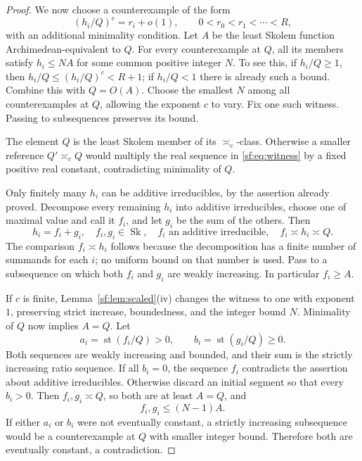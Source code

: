 \documentclass[10pt,a4paper]{amsart}
\newcommand{\Sk}{\operatorname{Sk}}
\newcommand{\arch}{\mathrel{\asymp}}
\newcommand{\st}{\operatorname{st}}
\begin{document}
\begin{proof}
We now choose a counterexample of the form
\begin{equation}
 (h_i/Q)^c=r_i+o(1),\qquad 0<r_0<r_1<\cdots<R,
 \label{sf:eq:witness}
\end{equation}
with an additional minimality condition. Let $A$ be the least Skolem
function Archimedean-equivalent to $Q$. For every counterexample
at $Q$, all its members satisfy $h_i\le NA$ for some common
positive integer $N$. To see this, if $h_i/Q\ge1$, then
$h_i/Q\le(h_i/Q)^c<R+1$; if $h_i/Q<1$ there is already such
a bound. Combine this with $Q=O(A)$. Choose the smallest $N$
among all counterexamples at $Q$, allowing the exponent $c$ to vary.
Fix one such witness. Passing to subsequences preserves its bound.

The element $Q$ is the least Skolem member of its $\arch_c$-class.
Otherwise a smaller reference $Q'\arch_c Q$ would multiply the
real sequence in \eqref{sf:eq:witness} by a fixed positive real constant,
contradicting minimality of $Q$.

Only finitely many $h_i$ can be additive irreducibles, by the assertion
already proved. Decompose every remaining $h_i$ into additive irreducibles,
choose one of maximal value and call it $f_i$, and let $g_i$ be the
sum of the others. Then
\begin{equation}
 h_i=f_i+g_i,\quad f_i,g_i\in\Sk,\quad
 f_i\text{ an additive irreducible},\quad f_i\arch h_i\arch Q.
 \label{sf:eq:split}
\end{equation}
The comparison $f_i\arch h_i$ follows because the decomposition
has a finite number of summands for each $i$; no uniform bound on
that number is used. Pass to a subsequence on which both $f_i$ and
$g_i$ are weakly increasing. In particular $f_i\ge A$.

If $c$ is finite, Lemma~\ref{sf:lem:scaled}(iv) changes the witness
to one with exponent $1$, preserving strict increase, boundedness,
and the integer bound $N$. Minimality of $Q$ now implies $A=Q$.
Let
\[
 a_i=\st(f_i/Q)>0,\qquad b_i=\st(g_i/Q)\ge0.
\]
Both sequences are weakly increasing and bounded, and their sum is
the strictly increasing ratio sequence. If all $b_i=0$, the
sequence $f_i$ contradicts the assertion about additive irreducibles.
Otherwise discard an initial segment so that every $b_i>0$.
Then $f_i,g_i\arch Q$, so both are at least $A=Q$, and
\[
 f_i,g_i\le(N-1)A.
\]
If either $a_i$ or $b_i$ were not eventually constant, a strictly
increasing subsequence would be a counterexample at $Q$ with smaller
integer bound. Therefore both are eventually constant, a contradiction.


\end{proof}
\end{document}
